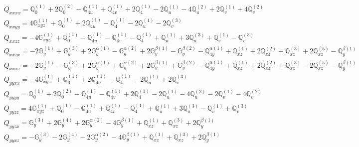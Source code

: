 \documentclass[fleqn,8pt,landscape]{jsarticle}
\begin{document}
\begin{align*}
& Q_{xxxx} = \mathbb{Q}_{0}^{(1)} + 2 \mathbb{Q}_{0}^{(2)} - \mathbb{Q}_{4u}^{(1)} + \mathbb{Q}_{4v}^{(1)} + 2 \mathbb{Q}_{4}^{(1)} - 2 \mathbb{Q}_{u}^{(1)} - 4 \mathbb{Q}_{u}^{(2)} + 2 \mathbb{Q}_{v}^{(1)} + 4 \mathbb{Q}_{v}^{(2)} \\
& Q_{xxyy} = 4 \mathbb{G}_{xyz}^{(1)} + \mathbb{Q}_{0}^{(1)} + 2 \mathbb{Q}_{4u}^{(1)} - \mathbb{Q}_{4}^{(1)} - 2 \mathbb{Q}_{u}^{(1)} - 2 \mathbb{Q}_{v}^{(3)} \\
& Q_{xxzz} = - 4 \mathbb{G}_{xyz}^{(1)} + \mathbb{Q}_{0}^{(1)} - \mathbb{Q}_{4u}^{(1)} - \mathbb{Q}_{4v}^{(1)} - \mathbb{Q}_{4}^{(1)} + \mathbb{Q}_{u}^{(1)} + 3 \mathbb{Q}_{u}^{(3)} + \mathbb{Q}_{v}^{(1)} - \mathbb{Q}_{v}^{(3)} \\
& Q_{xxzx} = - 2 \mathbb{G}_{y}^{(1)} + \mathbb{G}_{y}^{(3)} + 2 \mathbb{G}_{y}^{\alpha(1)} - \mathbb{G}_{y}^{\alpha(2)} + 2 \mathbb{G}_{y}^{\beta(1)} - \mathbb{G}_{y}^{\beta(2)} - \mathbb{Q}_{4y}^{\alpha(1)} + \mathbb{Q}_{xz}^{(1)} + 2 \mathbb{Q}_{xz}^{(2)} + \mathbb{Q}_{xz}^{(3)} + 2 \mathbb{Q}_{xz}^{(5)} - \mathbb{Q}_{y}^{\beta(1)} \\
& Q_{xxxz} = - 2 \mathbb{G}_{y}^{(1)} - \mathbb{G}_{y}^{(3)} + 2 \mathbb{G}_{y}^{\alpha(1)} + \mathbb{G}_{y}^{\alpha(2)} + 2 \mathbb{G}_{y}^{\beta(1)} + \mathbb{G}_{y}^{\beta(2)} - \mathbb{Q}_{4y}^{\alpha(1)} + \mathbb{Q}_{xz}^{(1)} + 2 \mathbb{Q}_{xz}^{(2)} + \mathbb{Q}_{xz}^{(3)} - 2 \mathbb{Q}_{xz}^{(5)} - \mathbb{Q}_{y}^{\beta(1)} \\
& Q_{yyxx} = - 4 \mathbb{G}_{xyz}^{(1)} + \mathbb{Q}_{0}^{(1)} + 2 \mathbb{Q}_{4u}^{(1)} - \mathbb{Q}_{4}^{(1)} - 2 \mathbb{Q}_{u}^{(1)} + 2 \mathbb{Q}_{v}^{(3)} \\
& Q_{yyyy} = \mathbb{Q}_{0}^{(1)} + 2 \mathbb{Q}_{0}^{(2)} - \mathbb{Q}_{4u}^{(1)} - \mathbb{Q}_{4v}^{(1)} + 2 \mathbb{Q}_{4}^{(1)} - 2 \mathbb{Q}_{u}^{(1)} - 4 \mathbb{Q}_{u}^{(2)} - 2 \mathbb{Q}_{v}^{(1)} - 4 \mathbb{Q}_{v}^{(2)} \\
& Q_{yyzz} = 4 \mathbb{G}_{xyz}^{(1)} + \mathbb{Q}_{0}^{(1)} - \mathbb{Q}_{4u}^{(1)} + \mathbb{Q}_{4v}^{(1)} - \mathbb{Q}_{4}^{(1)} + \mathbb{Q}_{u}^{(1)} + 3 \mathbb{Q}_{u}^{(3)} - \mathbb{Q}_{v}^{(1)} + \mathbb{Q}_{v}^{(3)} \\
& Q_{yyzx} = \mathbb{G}_{y}^{(3)} + 2 \mathbb{G}_{y}^{(4)} + 2 \mathbb{G}_{y}^{\alpha(2)} - 4 \mathbb{G}_{y}^{\beta(1)} + \mathbb{Q}_{xz}^{(1)} + \mathbb{Q}_{xz}^{(3)} + 2 \mathbb{Q}_{y}^{\beta(1)} \\
& Q_{yyxz} = - \mathbb{G}_{y}^{(3)} - 2 \mathbb{G}_{y}^{(4)} - 2 \mathbb{G}_{y}^{\alpha(2)} - 4 \mathbb{G}_{y}^{\beta(1)} + \mathbb{Q}_{xz}^{(1)} + \mathbb{Q}_{xz}^{(3)} + 2 \mathbb{Q}_{y}^{\beta(1)} \\

\end{align*}
\end{document}
